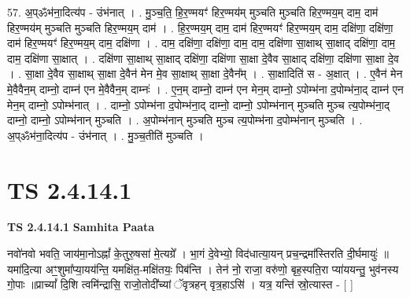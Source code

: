 \documentclass[17pt]{extarticle}
\begin{document}
57. अ॒प्ॐभ॑ना॒दित्य॑प - उंभ॑नात् । . मु॒ञ्च॒ति॒ हि॒र॒ण्मयꣳ॑ हिर॒ण्मय॑म् मुञ्चति मुञ्चति हिर॒ण्मय॒म् दाम॒ दाम॑ हिर॒ण्मय॑म् मुञ्चति मुञ्चति हिर॒ण्मय॒म् दाम॑ । . हि॒र॒ण्मय॒म् दाम॒ दाम॑ हिर॒ण्मयꣳ॑ हिर॒ण्मय॒म् दाम॒ दक्षि॑णा॒ दक्षि॑णा॒ दाम॑ हिर॒ण्मयꣳ॑ हिर॒ण्मय॒म् दाम॒ दक्षि॑णा । . दाम॒ दक्षि॑णा॒ दक्षि॑णा॒ दाम॒ दाम॒ दक्षि॑णा सा॒क्षाथ् सा॒क्षाद् दक्षि॑णा॒ दाम॒ दाम॒ दक्षि॑णा सा॒क्षात् । . दक्षि॑णा सा॒क्षाथ् सा॒क्षाद् दक्षि॑णा॒ दक्षि॑णा सा॒क्षा दे॒वैव सा॒क्षाद् दक्षि॑णा॒ दक्षि॑णा सा॒क्षा दे॒व । . सा॒क्षा दे॒वैव सा॒क्षाथ् सा॒क्षा दे॒वैन॑ मेन मे॒व सा॒क्षाथ् सा॒क्षा दे॒वैन᳚म् । . सा॒क्षादिति॑ स - अ॒क्षात् । . ए॒वैन॑ मेन मे॒वैवैन॒म् दाम्नो॒ दाम्न॑ एन मे॒वैवैन॒म् दाम्नः॑ । . ए॒न॒म् दाम्नो॒ दाम्न॑ एन मेन॒म् दाम्नो॒ ऽपोम्भ॑ना द॒पोम्भ॑ना॒द् दाम्न॑ एन मेन॒म् दाम्नो॒ ऽपोम्भ॑नात् । . दाम्नो॒ ऽपोम्भ॑ना द॒पोम्भ॑ना॒द् दाम्नो॒ दाम्नो॒ ऽपोम्भ॑नान् मुञ्चति मुञ्च त्य॒पोम्भ॑ना॒द् दाम्नो॒ दाम्नो॒ ऽपोम्भ॑नान् मुञ्चति । . अ॒पोम्भ॑नान् मुञ्चति मुञ्च त्य॒पोम्भ॑ना द॒पोम्भ॑नान् मुञ्चति । . अ॒प्ॐभ॑ना॒दित्य॑प - उंभ॑नात् । . मु॒ञ्च॒तीति॑ मुञ्चति । \newline
\pagebreak
{}

\section{ TS 2.4.14.1 }

\textbf{TS 2.4.14.1 } \newline
\textbf{Samhita Paata} \newline

नवो॑नवो भवति॒ जाय॑मा॒नोऽह्नां᳚ के॒तुरु॒षसा॑ मे॒त्यग्रे᳚ । भा॒गं दे॒वेभ्यो॒ विद॑धात्या॒यन् प्रच॒न्द्रमा᳚स्तिरति दी॒र्घमायुः॑ ॥ यमा॑दि॒त्या अꣳ॒॒शुमा᳚प्या॒यय॑न्ति॒ यमक्षि॑त॒-मक्षि॑तयः॒ पिब॑न्ति । तेन॑ नो॒ राजा॒ वरु॑णो॒ बृह॒स्पति॒रा प्या॑ययन्तु॒ भुव॑नस्य गो॒पाः ॥प्राच्यां᳚ दि॒शि त्वमि॑न्द्रासि॒ राजो॒तोदी᳚च्यां ॅवृत्रहन् वृत्र॒हाऽसि॑ । यत्र॒ यन्ति॑ स्रो॒त्यास्त - [  ] \newline
\end{document}
